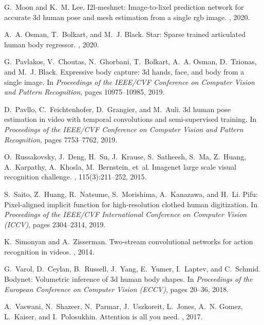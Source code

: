 \documentclass[10pt,twocolumn,letterpaper]{article}
\begin{document}
\begin{thebibliography}{10}
G.~Moon and K.~M. Lee.
\newblock I2l-meshnet: Image-to-lixel prediction network for accurate 3d human
  pose and mesh estimation from a single rgb image.
, 2020.

A.~A. Osman, T.~Bolkart, and M.~J. Black.
\newblock Star: Sparse trained articulated human body regressor.
, 2020.

G.~Pavlakos, V.~Choutas, N.~Ghorbani, T.~Bolkart, A.~A. Osman, D.~Tzionas, and
  M.~J. Black.
\newblock Expressive body capture: 3d hands, face, and body from a single
  image.
\newblock In {\em Proceedings of the IEEE/CVF Conference on Computer Vision and
  Pattern Recognition}, pages 10975--10985, 2019.

D.~Pavllo, C.~Feichtenhofer, D.~Grangier, and M.~Auli.
\newblock 3d human pose estimation in video with temporal convolutions and
  semi-supervised training.
\newblock In {\em Proceedings of the IEEE/CVF Conference on Computer Vision and
  Pattern Recognition}, pages 7753--7762, 2019.

O.~Russakovsky, J.~Deng, H.~Su, J.~Krause, S.~Satheesh, S.~Ma, Z.~Huang,
  A.~Karpathy, A.~Khosla, M.~Bernstein, et~al.
\newblock Imagenet large scale visual recognition challenge.
, 115(3):211--252,
  2015.

S.~Saito, Z.~Huang, R.~Natsume, S.~Morishima, A.~Kanazawa, and H.~Li.
\newblock Pifu: Pixel-aligned implicit function for high-resolution clothed
  human digitization.
\newblock In {\em Proceedings of the IEEE/CVF International Conference on
  Computer Vision (ICCV)}, pages 2304--2314, 2019.

K.~Simonyan and A.~Zisserman.
\newblock Two-stream convolutional networks for action recognition in videos.
, 2014.

G.~Varol, D.~Ceylan, B.~Russell, J.~Yang, E.~Yumer, I.~Laptev, and C.~Schmid.
\newblock Bodynet: Volumetric inference of 3d human body shapes.
\newblock In {\em Proceedings of the European Conference on Computer Vision
  (ECCV)}, pages 20--36, 2018.

A.~Vaswani, N.~Shazeer, N.~Parmar, J.~Uszkoreit, L.~Jones, A.~N. Gomez,
  L.~Kaiser, and I.~Polosukhin.
\newblock Attention is all you need.
, 2017.


\end{thebibliography}
\end{document}
